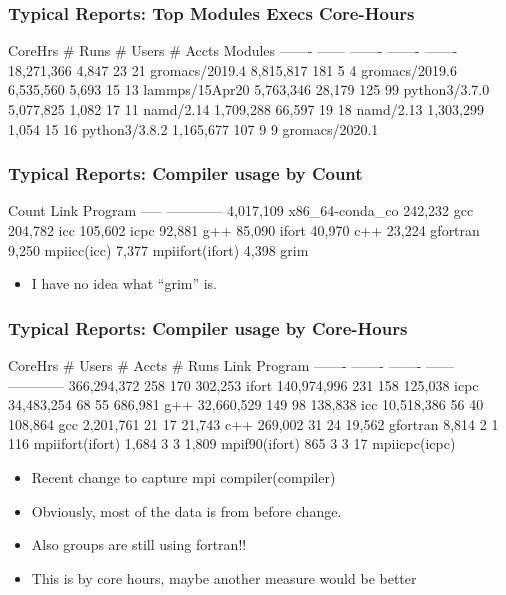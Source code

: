 \documentclass{beamer}
\begin{document}
\begin{frame}[fragile]
    \frametitle{Typical Reports: Top Modules Execs Core-Hours}
 {\tiny
    \begin{semiverbatim}
   CoreHrs  # Runs  # Users  # Accts  Modules
   -------  ------  -------  -------  -------
18,271,366   4,847       23       21  gromacs/2019.4
 8,815,817     181        5        4  gromacs/2019.6
 6,535,560   5,693       15       13  lammps/15Apr20
 5,763,346  28,179      125       99  python3/3.7.0
 5,077,825   1,082       17       11  namd/2.14
 1,709,288  66,597       19       18  namd/2.13
 1,303,299   1,054       15       16  python3/3.8.2
 1,165,677     107        9        9  gromacs/2020.1
    \end{semiverbatim}
}
\end{frame}

\begin{frame}[fragile]
    \frametitle{Typical Reports: Compiler usage by Count}
 {\small
    \begin{semiverbatim}
    Count  Link Program
    -----  ------------
4,017,109  x86_64-conda_co
  242,232  gcc
  204,782  icc
  105,602  icpc
   92,881  g++
   85,090  ifort
   40,970  c++
   23,224  gfortran
    9,250  mpiicc(icc)
    7,377  mpiifort(ifort)
    4,398  grim
    \end{semiverbatim}
}
  \begin{itemize}
    \item I have no idea what ``grim'' is.
  \end{itemize}
\end{frame}


\begin{frame}[fragile]
    \frametitle{Typical Reports: Compiler usage by Core-Hours}
 {\tiny
    \begin{semiverbatim}
    CoreHrs  # Users  # Accts  # Runs   Link Program
    -------  -------  -------  ------   ------------
366,294,372      258      170  302,253  ifort
140,974,996      231      158  125,038  icpc
 34,483,254       68       55  686,981  g++
 32,660,529      149       98  138,838  icc
 10,518,386       56       40  108,864  gcc
  2,201,761       21       17  21,743   c++
    269,002       31       24  19,562   gfortran
      8,814        2        1  116      mpiifort(ifort)
      1,684        3        3  1,809    mpif90(ifort)
        865        3        3  17       mpiicpc(icpc)
    \end{semiverbatim}
}
  \begin{itemize}
    \item Recent change to capture mpi compiler(compiler)
    \item Obviously, most of the data is from before change.
    \item Also groups are still using fortran!!
    \item This is by core hours, maybe another measure would be better
  \end{itemize}
\end{frame}
\end{document}
